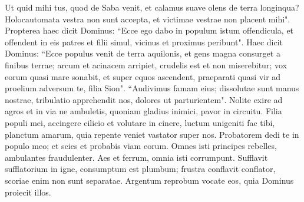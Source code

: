 \begin{biblechapter}
\verse Ut quid mihi tus, quod de Saba venit, et calamus suave olens de terra longinqua? Holocautomata vestra non sunt accepta, et victimae vestrae non placent mihi". 
\verse Propterea haec dicit Dominus: “Ecce ego dabo in populum istum offendicula, et offendent in eis patres et filii simul, vicinus et proximus peribunt". 
\verse Haec dicit Dominus: “Ecce populus venit de terra aquilonis, et gens magna consurget a finibus terrae; 
\verse arcum et acinacem arripiet, crudelis est et non miserebitur; vox eorum quasi mare sonabit, et super equos ascendent, praeparati quasi vir ad proelium adversum te, filia Sion". 
\verse “Audivimus famam eius; dissolutae sunt manus nostrae, tribulatio apprehendit nos, dolores ut parturientem". 
\verse Nolite exire ad agros et in via ne ambuletis, quoniam gladius inimici, pavor in circuitu. 
\verse Filia populi mei, accingere cilicio et volutare in cinere, luctum unigeniti fac tibi, planctum amarum, quia repente veniet vastator super nos. 
\verse Probatorem dedi te in populo meo; et scies et probabis viam eorum. 
\verse Omnes isti principes rebelles, ambulantes fraudulenter. Aes et ferrum, omnia isti corrumpunt. 
\verse Sufflavit sufflatorium in igne, consumptum est plumbum; frustra conflavit conflator, scoriae enim non sunt separatae. 
\verse Argentum reprobum vocate eos, quia Dominus proiecit illos. 
\end{biblechapter}

